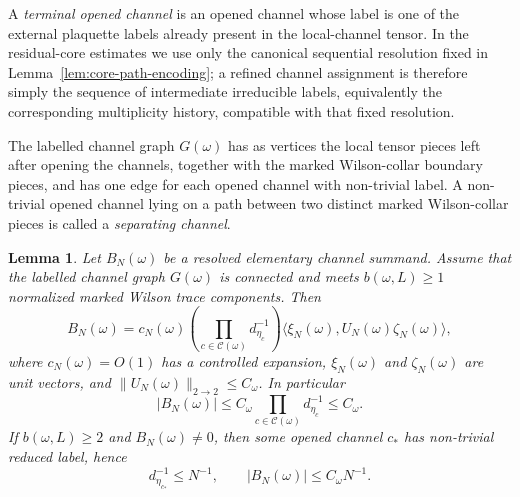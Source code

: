 \documentclass[11pt,a4paper,reqno]{amsart}
\newtheorem{lemma}[theorem]{Lemma}
\theoremstyle{definition}
\theoremstyle{remark}
\begin{document}
A \emph{terminal opened channel} is an opened channel whose label is one of the external plaquette labels already present in the local-channel tensor.  In the residual-core estimates we use only the canonical sequential resolution fixed in Lemma~\ref{lem:core-path-encoding}; a refined channel assignment is therefore simply the sequence of intermediate irreducible labels, equivalently the corresponding multiplicity history, compatible with that fixed resolution.

The labelled channel graph $G(\omega)$ has as vertices the local tensor pieces left after opening the channels, together with the marked Wilson-collar boundary pieces, and has one edge for each opened channel with non-trivial label. A non-trivial opened channel lying on a path between two distinct marked Wilson-collar pieces is called a \emph{separating channel}.

\begin{lemma}\label{lem:degree-pinned-block}
Let $B_N(\omega)$ be a resolved elementary channel summand.  Assume that the labelled channel graph $G(\omega)$ is connected and meets $b(\omega,L)\ge1$ normalized marked Wilson trace components.  Then
\begin{equation}\label{eq:separating-channel-elementary-summand}
B_N(\omega)
=
c_N(\omega)
\left(\prod_{c\in\mathcal C(\omega)} d_{\eta_c}^{-1}\right)
\langle \xi_N(\omega),U_N(\omega)\zeta_N(\omega)\rangle,
\end{equation}
where $c_N(\omega)=O(1)$ has a controlled expansion, $\xi_N(\omega)$ and $\zeta_N(\omega)$ are unit vectors, and $\|U_N(\omega)\|_{2\to2}\le C_\omega$.  In particular
\[
|B_N(\omega)|\le C_\omega\prod_{c\in\mathcal C(\omega)}d_{\eta_c}^{-1}\le C_\omega .
\]
If $b(\omega,L)\ge2$ and $B_N(\omega)\ne0$, then some opened channel $c_*$ has non-trivial reduced label, hence
\begin{equation}\label{eq:separating-channel-dim-loss}
d_{\eta_{c_*}}^{-1}\le N^{-1},
\qquad
|B_N(\omega)|\le C_\omega N^{-1}.
\end{equation}
\end{lemma}
\end{document}
